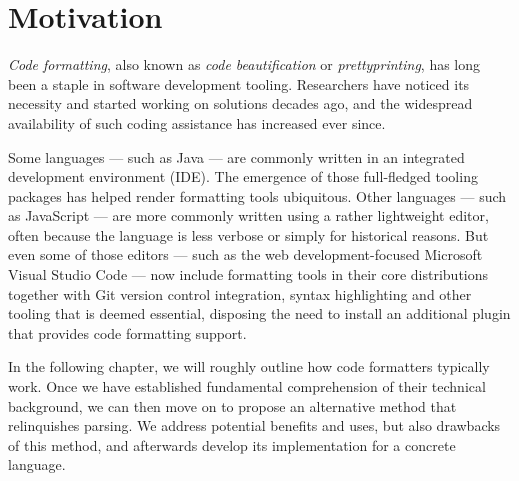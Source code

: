 \chapter{Motivation}
\textit{Code formatting}, also known as \textit{code beautification} or \textit{prettyprinting},
has long been a staple in software development tooling.
Researchers have noticed its necessity and started working on solutions decades ago,
\autocite{syntaxDirectedPrettyprinting}
and the widespread availability of such coding assistance has increased ever since.

Some languages --- such as Java --- are commonly written in an integrated development environment (IDE).
The emergence of those full-fledged tooling packages has helped render formatting tools ubiquitous.
Other languages --- such as JavaScript --- are more commonly written using a rather lightweight editor,
often because the language is less verbose or simply for historical reasons.
But even some of those editors --- such as the web development-focused Microsoft Visual Studio Code ---
now include formatting tools in their core distributions together with
Git version control integration, syntax highlighting and other tooling that is deemed essential,
disposing the need to install an additional plugin that provides code formatting support.

In the following chapter, we will roughly outline how code formatters typically work.
Once we have established fundamental comprehension of their technical background,
we can then move on to propose an alternative method that relinquishes parsing.
We address potential benefits and uses, but also drawbacks of this method,
and afterwards develop its implementation for a concrete language.
